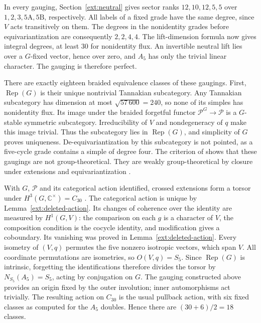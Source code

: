 \documentclass[11pt]{amsart}
\numberwithin{equation}{section}
\theoremstyle{definition}
\theoremstyle{plain}
\begin{document}
In every gauging, Section~\ref{ext:neutral} gives sector ranks
$12,10,12,5,5$ over
$1,2,3,5\mathrm A,5\mathrm B$, respectively. All labels of a fixed grade have the same degree,
since $V$ acts transitively on them. The degrees in the nonidentity
grades before equivariantization are consequently $2,2,4,4$.
The lift-dimension formula now gives integral degrees, at least $30$
for nonidentity flux. An invertible neutral lift lies over a $G$-fixed
vector, hence over zero, and $A_5$ has only the trivial linear character.
The gauging is therefore perfect.

There are exactly eighteen braided equivalence classes of these gaugings.
First, $\operatorname{Rep}(G)$ is their unique nontrivial Tannakian
subcategory. Any Tannakian subcategory has dimension at most
$\sqrt{57\,600}=240$, so none of its simples has nonidentity flux.
Its image under the braided forgetful functor $\mathcal P^G\to\mathcal P$
is a $G$-stable symmetric subcategory. Irreducibility of $V$ and
nondegeneracy of $q$ make this image trivial. Thus the subcategory lies
in $\operatorname{Rep}(G)$, and simplicity of $G$ proves uniqueness.
De-equivariantization by this subcategory is not pointed, as a
five-cycle grade contains a simple of degree four. The criterion
of \cite[Theorem~7.2]{NNWSubcategories} shows that these gaugings
are not group-theoretical. They are weakly group-theoretical by closure
under extensions and equivariantization \cite[Proposition~4.1]{ENOWGT}.

With $G$, $\mathcal P$ and its categorical action identified, crossed
extensions form a torsor under $H^3(G,\mathbb C^\times)=C_{30}$
\cite[\S2.2]{GannonJonesPermutation}. The categorical action is unique
by Lemma~\ref{ext:deleted-action}. Its changes of coherence over
the identity are measured by $H^1(G,V)$: the comparison on each $g$
is a character of $V$, the composition condition is the cocycle
identity, and modification gives a coboundary. Its vanishing was
proved in Lemma~\ref{ext:deleted-action}.
Every isometry of $(V,q)$ permutes the five nonzero isotropic vectors,
which span $V$. All coordinate permutations are isometries, so
$O(V,q)=S_5$. Since $\operatorname{Rep}(G)$ is intrinsic,
forgetting the identifications therefore divides the torsor by
$N_{S_5}(A_5)=S_5$, acting by conjugation on $G$. The gauging
constructed above provides an origin fixed by the outer involution;
inner automorphisms act trivially. The resulting action on $C_{30}$ is
the usual pullback action, with six fixed classes as computed for the
$A_5$ doubles. Hence there are $(30+6)/2=18$ classes.
\end{document}
